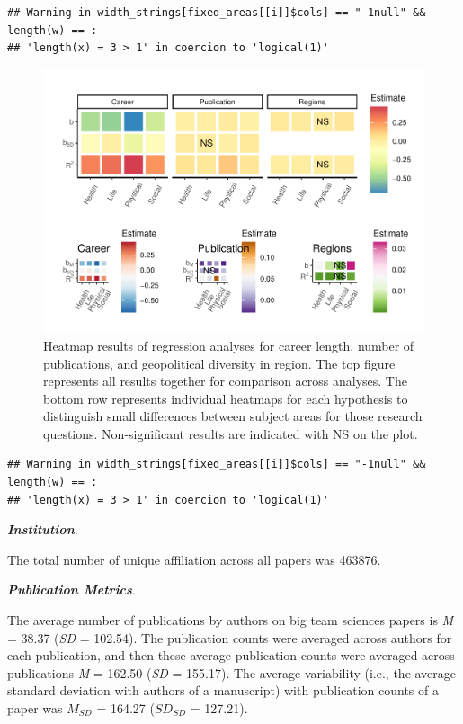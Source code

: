 \documentclass[
  man,floatsintext]{apa6}
\begin{document}
\begin{verbatim}
## Warning in width_strings[fixed_areas[[i]]$cols] == "-1null" && length(w) == :
## 'length(x) = 3 > 1' in coercion to 'logical(1)'
\end{verbatim}

\begin{figure}
\centering
\includegraphics{manuscript_scopus_files/figure-latex/fig-heatmap-1.pdf}
\caption{\label{fig:fig-heatmap}Heatmap results of regression analyses for career length, number of publications, and geopolitical diversity in region. The top figure represents all results together for comparison across analyses. The bottom row represents individual heatmaps for each hypothesis to distinguish small differences between subject areas for those research questions. Non-significant results are indicated with NS on the plot.}
\end{figure}

\begin{verbatim}
## Warning in width_strings[fixed_areas[[i]]$cols] == "-1null" && length(w) == :
## 'length(x) = 3 > 1' in coercion to 'logical(1)'
\end{verbatim}

\textbf{\emph{Institution}}.

The total number of unique affiliation across all papers was 463876.

\textbf{\emph{Publication Metrics}}.

The average number of publications by authors on big team sciences
papers is \emph{M} = 38.37 (\emph{SD} =
102.54). The publication counts were averaged across
authors for each publication, and then these average publication counts
were averaged across publications \emph{M} = 162.50 (\emph{SD} =
155.17). The average variability (i.e., the average
standard deviation with authors of a manuscript) with publication counts
of a paper was \(M_{SD}\) = 164.27 (\(SD_{SD}\) =
127.21).
\end{document}
